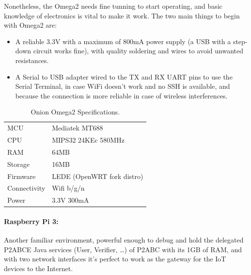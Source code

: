 Nonetheless, the Omega2 needs fine tunning to start operating, and basic knowledge of electronics is vital to make it work. The two main things to begin with Omega2 are:
\begin{itemize}
	\item A reliable 3.3V with a maximum of 800mA power supply (a USB with a step-down circuit works fine), with quality soldering and wires to avoid unwanted resistances.
	\item A Serial to USB adapter wired to the TX and RX UART pins to use the Serial Terminal, in case WiFi doesn't work and no SSH is available, and because the connection is more reliable in case of wireless interferences.
\end{itemize}


\begin{table}[h]
	\myfloatalign
	\begin{tabularx}{0.75\textwidth}{ll} \toprule
		MCU & Mediatek MT688 \citep{MT7688} \\
		CPU & MIPS32 24KEc 580MHz \\
		RAM & 64MB \\
		Storage & 16MB \\
		Firmware & LEDE (OpenWRT fork distro) \\
		Connectivity & Wifi b/g/n \\
		Power & 3.3V 300mA \\
		\bottomrule
	\end{tabularx}
	\caption[Onion Omega 2 Specifications]{Onion Omega2 Specifications.}
	\label{tab:Omega2Specs}
\end{table}




\paragraph{Raspberry Pi 3:} Another familiar environment, powerful enough to debug and hold the delegated \ac{P2ABCE} Java services (User, Verifier, \dots) of P2ABC with its 1GB of RAM, and with two network interfaces it's perfect to work as the gateway for the IoT devices to the Internet.

